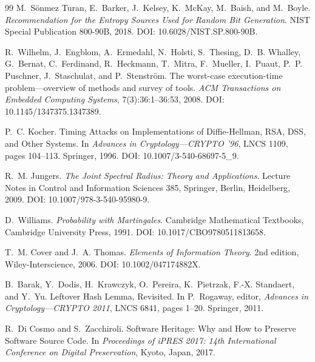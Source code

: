 \documentclass[11pt]{article}
\theoremstyle{definition}
\newcommand{\1}{\mathbf{1}}
\begin{document}
\begin{thebibliography}{99}
M.~S\"onmez Turan, E.~Barker, J.~Kelsey, K.~McKay, M.~Baish, and M.~Boyle.
\newblock \emph{Recommendation for the Entropy Sources Used for Random Bit Generation}.
\newblock NIST Special Publication 800-90B, 2018. DOI: 10.6028/NIST.SP.800-90B.

R.~Wilhelm, J.~Engblom, A.~Ermedahl, N.~Holsti, S.~Thesing, D.~B. Whalley, G.~Bernat, C.~Ferdinand, R.~Heckmann, T.~Mitra, F.~Mueller, I.~Puaut, P.~P. Puschner, J.~Staschulat, and P.~Stenstr\"om.
\newblock The worst-case execution-time problem---overview of methods and survey of tools.
\newblock \emph{ACM Transactions on Embedded Computing Systems}, 7(3):36:1--36:53, 2008. DOI: 10.1145/1347375.1347389.

P.~C. Kocher.
\newblock Timing Attacks on Implementations of Diffie-Hellman, RSA, DSS, and Other Systems.
\newblock In \emph{Advances in Cryptology---CRYPTO '96}, LNCS 1109, pages 104--113. Springer, 1996. DOI: 10.1007/3-540-68697-5\_9.



R.~M. Jungers.
\newblock \emph{The Joint Spectral Radius: Theory and Applications}.
\newblock Lecture Notes in Control and Information Sciences 385, Springer, Berlin, Heidelberg, 2009. DOI: 10.1007/978-3-540-95980-9.

D.~Williams.
\newblock \emph{Probability with Martingales}.
\newblock Cambridge Mathematical Textbooks, Cambridge University Press, 1991. DOI: 10.1017/CBO9780511813658.

T.~M. Cover and J.~A. Thomas.
\newblock \emph{Elements of Information Theory}.
\newblock 2nd edition, Wiley-Interscience, 2006. DOI: 10.1002/047174882X.

B.~Barak, Y.~Dodis, H.~Krawczyk, O.~Pereira, K.~Pietrzak, F.-X. Standaert, and Y.~Yu.
\newblock Leftover Hash Lemma, Revisited.
\newblock In P.~Rogaway, editor, \emph{Advances in Cryptology---CRYPTO 2011}, LNCS 6841, pages 1--20. Springer, 2011.

R.~Di Cosmo and S.~Zacchiroli.
\newblock Software Heritage: Why and How to Preserve Software Source Code.
\newblock In \emph{Proceedings of iPRES 2017: 14th International Conference on Digital Preservation}, Kyoto, Japan, 2017.

\end{thebibliography}
\end{document}
